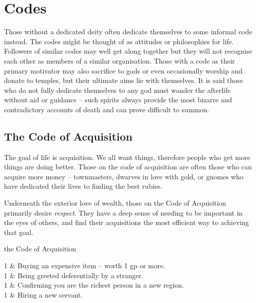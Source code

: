 \section{Codes}

\begin{multicols}{2}

Those without a dedicated deity often dedicate themselves to some informal code instead. The codes might be thought of as attitudes or philosophies for life. Followers of similar codes may well get along together but they will not recognise each other as members of a similar organisation. Those with a code as their primary motivator may also sacrifice to gods or even occasionally worship and donate to temples, but their ultimate aims lie with themselves. It is said those who do not fully dedicate themselves to any god must wander the afterlife without aid or guidance -- such spirits always provide the most bizarre and contradictory accounts of death and can prove difficult to summon.

\subsection{The Code of Acquisition}

The goal of life is acquisition.
We all want things, therefore people who get more things are doing better.
Those on the code of acquisition are often those who can acquire more money -- townmasters, dwarves in love with gold, or gnomes who have dedicated their lives to finding the best rubies.

Underneath the exterior love of wealth, those on the Code of Acquisition primarily desire \emph{respect}.
They have a deep sense of needing to be important in the eyes of others, and find their acquisitions the most efficient way to achieving that goal.

\begin{xpchart}{the Code of Acquisition}

	1 & Buying an expensive item -- worth 1 gp or more. \\

	1 & Being greeted deferentially by a stranger. \\

	1 & Confirming you are the richest person in a new region. \\

	1 & Hiring a new servant. \\


\end{xpchart}
\end{multicols}

